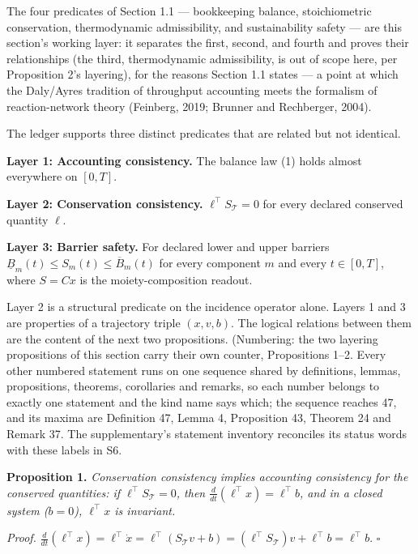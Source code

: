 \documentclass[11pt]{article}
\begin{document}
The four predicates of Section 1.1 --- bookkeeping balance, stoichiometric conservation, thermodynamic admissibility, and sustainability safety --- are this section's working layer: it separates the first, second, and fourth and proves their relationships (the third, thermodynamic admissibility, is out of scope here, per Proposition 2's layering), for the reasons Section 1.1 states --- a point at which the Daly/\allowbreak{}Ayres tradition of throughput accounting meets the formalism of reaction-network theory (Feinberg, 2019; Brunner and Rechberger, 2004).

The ledger supports three distinct predicates that are related but not identical.

\textbf{Layer 1: Accounting consistency.} The balance law (1) holds almost everywhere on \([0,T]\).

\textbf{Layer 2: Conservation consistency.} \(\ell^\top S_{\mathcal{T}} = 0\) for every declared conserved quantity \(\ell\).

\textbf{Layer 3: Barrier safety.} For declared lower and upper barriers \(\underline{B}_m(t) \le S_m(t) \le \overline{B}_m(t)\) for every component \(m\) and every \(t \in [0,T]\), where \(S = Cx\) is the moiety-composition readout.

Layer 2 is a structural predicate on the incidence operator alone. Layers 1 and 3 are properties of a trajectory triple \((x, v, b)\). The logical relations between them are the content of the next two propositions. (Numbering: the two layering propositions of this section carry their own counter, Propositions 1--2. Every other numbered statement runs on one sequence shared by definitions, lemmas, propositions, theorems, corollaries and remarks, so each number belongs to exactly one statement and the kind name says which; the sequence reaches 47, and its maxima are Definition 47, Lemma 4, Proposition 43, Theorem 24 and Remark 37. The supplementary's statement inventory reconciles its status words with these labels in S6.

\textbf{Proposition 1.} \emph{Conservation consistency implies accounting consistency for the conserved quantities: if \(\ell^\top S_{\mathcal{T}} = 0\), then \(\frac{d}{dt}(\ell^\top x) =\allowbreak{} \ell^\top b\), and in a closed system (\(b = 0\)), \(\ell^\top x\) is invariant.}

\emph{Proof.} \(\frac{d}{dt}(\ell^\top x) =\allowbreak{} \ell^\top \dot x =\allowbreak{} \ell^\top(S_{\mathcal{T}} v +\allowbreak{} b) =\allowbreak{} (\ell^\top S_{\mathcal{T}}) v +\allowbreak{} \ell^\top b =\allowbreak{} \ell^\top b\). \(\square\)
\end{document}
